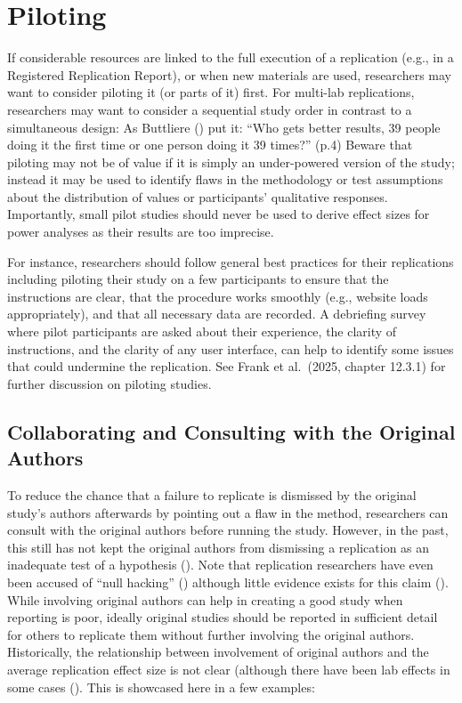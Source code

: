 \documentclass[
  letterpaper,
  DIV=11,
  openany,
  fontsize=12pt,
  parskip=half,
  headings=big,
  numbers=noenddot,
  titlepage=false]{scrreprt}
\begin{document}
\section{Piloting}\label{piloting}

If considerable resources are linked to the full execution of a
replication (e.g., in a Registered Replication Report), or when new
materials are used, researchers may want to consider piloting it (or
parts of it) first. For multi-lab replications, researchers may want to
consider a sequential study order in contrast to a simultaneous design:
As Buttliere () put it: ``Who gets
better results, 39 people doing it the first time or one person doing it
39 times?'' (p.4) Beware that piloting may not be of value if it is
simply an under-powered version of the study; instead it may be used to
identify flaws in the methodology or test assumptions about the
distribution of values or participants' qualitative responses.
Importantly, small pilot studies should never be used to derive effect
sizes for power analyses as their results are too imprecise.

For instance, researchers should follow general best practices for their
replications including piloting their study on a few participants to
ensure that the instructions are clear, that the procedure works
smoothly (e.g., website loads appropriately), and that all necessary
data are recorded. A debriefing survey where pilot participants are
asked about their experience, the clarity of instructions, and the
clarity of any user interface, can help to identify some issues that
could undermine the replication. See Frank et al.~(2025, chapter 12.3.1)
for further discussion on piloting studies.

\subsection{Collaborating and Consulting with the Original
Authors}\label{collaborating-and-consulting-with-the-original-authors}

To reduce the chance that a failure to replicate is dismissed by the
original study's authors afterwards by pointing out a flaw in the
method, researchers can consult with the original authors before running
the study. However, in the past, this still has not kept the original
authors from dismissing a replication as an inadequate test of a
hypothesis (). Note that replication researchers have even been accused of
``null hacking'' () although
little evidence exists for this claim
(). While involving original authors can help in creating a good
study when reporting is poor, ideally original studies should be
reported in sufficient detail for others to replicate them without
further involving the original authors. Historically, the relationship
between involvement of original authors and the average replication
effect size is not clear (although there have been lab effects in some
cases (). This is
showcased here in a few examples:
\end{document}
